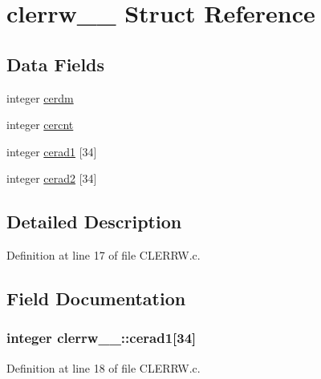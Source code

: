 \hypertarget{structclerrw__1__}{}\section{clerrw\+\_\+\_\+ Struct Reference}
\label{structclerrw__1__}
\subsection*{Data Fields}
\begin{DoxyCompactItemize}
\item 
integer \hyperlink{structclerrw__1___ab9df427398c30754c709a46c69cdbe30}{cerdm}
\item 
integer \hyperlink{structclerrw__1___a5d701f6074bf0778740e0916532321c1}{cercnt}
\item 
integer \hyperlink{structclerrw__1___a8d2fe3f70a55d4d8f0b0d0b8668ff563}{cerad1} \mbox{[}34\mbox{]}
\item 
integer \hyperlink{structclerrw__1___a9742bc326ea0ac30259718a2f0114a02}{cerad2} \mbox{[}34\mbox{]}
\end{DoxyCompactItemize}


\subsection{Detailed Description}


Definition at line 17 of file C\+L\+E\+R\+R\+W.\+c.



\subsection{Field Documentation}
\subsubsection[{\texorpdfstring{cerad1}{cerad1}}]{\setlength{\rightskip}{0pt plus 5cm}integer clerrw\+\_\+\_\+\+::cerad1\mbox{[}34\mbox{]}}\hypertarget{structclerrw__1___a8d2fe3f70a55d4d8f0b0d0b8668ff563}{}\label{structclerrw__1___a8d2fe3f70a55d4d8f0b0d0b8668ff563}


Definition at line 18 of file C\+L\+E\+R\+R\+W.\+c.

